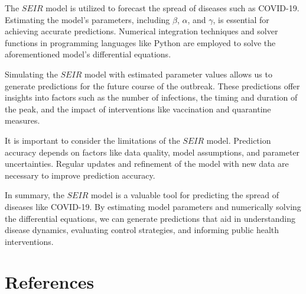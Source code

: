 \documentclass[13pt,a4paper]{report}
\begin{document}
The $SEIR$ model is utilized to forecast the spread of diseases such as COVID-19. Estimating the model's parameters, including $\beta$, $\alpha$, and $\gamma$, is essential for achieving accurate predictions. Numerical integration techniques and solver functions in programming languages like Python are employed to solve the aforementioned model's differential equations.

Simulating the $SEIR$ model with estimated parameter values allows us to generate predictions for the future course of the outbreak. These predictions offer insights into factors such as the number of infections, the timing and duration of the peak, and the impact of interventions like vaccination and quarantine measures.

It is important to consider the limitations of the $SEIR$ model. Prediction accuracy depends on factors like data quality, model assumptions, and parameter uncertainties. Regular updates and refinement of the model with new data are necessary to improve prediction accuracy.

In summary, the $SEIR$ model is a valuable tool for predicting the spread of diseases like COVID-19. By estimating model parameters and numerically solving the differential equations, we can generate predictions that aid in understanding disease dynamics, evaluating control strategies, and informing public health interventions.

\newpage
\section{References}
\vspace{0.25cm}
    \begin{otherlanguage}{vietnamese}
        \nocite{*}%
        \printbibliography[heading=none]
    \end{otherlanguage}
\end{document}

